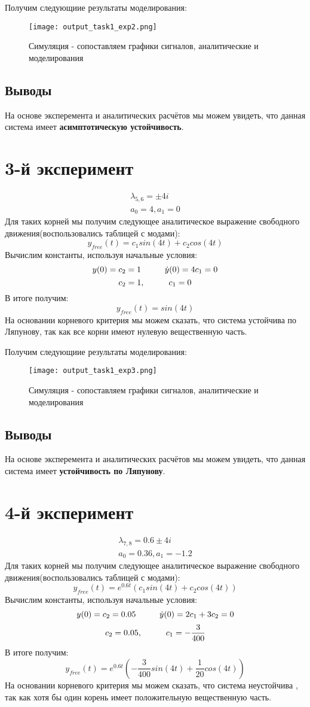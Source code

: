 Получим следующиие результаты моделирования:
\begin{figure}[ht]
    \centering
    \texttt{[image: output\_task1\_exp2.png]}
	\caption{Симуляция - сопоставляем графики сигналов, аналитические и моделирования}
\end{figure}
\subsection{Выводы}
На основе эксперемента и аналитических расчётов мы можем увидеть, что данная система имеет \textbf{асимптотическую устойчивость}.


\newpage
\section{3-й эксперимент}
$$
\begin{aligned}
    \lambda_{5,6} = \pm 4i \\
    a_0 = 4, a_1 = 0
\end{aligned}
$$
Для таких корней мы получим следующее аналитическое выражение свободного движения(воспользовались таблицей с модами):
$$
y_{free}(t) = c_1sin(4t) + c_2cos(4t)
$$
Вычислим константы, используя начальные условия:
$$
    y(0) = c_2 = 1 \hspace*{1cm} \dot{y}(0) = 4c_1 = 0 
$$
$$
    c_2 = 1, \hspace*{1cm} c_1 = 0
$$
В итоге получим:
$$
y_{free}(t) =  sin(4t)
$$
На основании корневого критерия мы можем сказать, что система устойчива по Ляпунову, так как все корни имеют нулевую вещественную часть.

Получим следующиие результаты моделирования:
\begin{figure}[ht]
    \centering
    \texttt{[image: output\_task1\_exp3.png]}
	\caption{Симуляция - сопоставляем графики сигналов, аналитические и моделирования}
\end{figure}
\subsection{Выводы}
На основе эксперемента и аналитических расчётов мы можем увидеть, что данная система имеет \textbf{устойчивость по Ляпунову}.

\newpage
\section{4-й эксперимент}
$$
\begin{aligned}
    \lambda_{7,8} = 0.6 \pm 4i \\
    a_0 = 0.36, a_1 = -1.2
\end{aligned}
$$
Для таких корней мы получим следующее аналитическое выражение свободного движения(воспользовались таблицей с модами):
$$
y_{free}(t) = e^{0.6t}(c_1sin(4t) + c_2cos(4t))
$$
Вычислим константы, используя начальные условия:
$$
    y(0) = c_2 = 0.05 \hspace*{1cm} \dot{y}(0) = 2c_1 + 3c_2 = 0 
$$
$$
    c_2 = 0.05, \hspace*{1cm} c_1 = -\frac{3}{400}
$$
В итоге получим:
$$
y_{free}(t) =  e^{0.6t}(-\frac{3}{400}sin(4t) + \frac{1}{20}cos(4t))
$$
На основании корневого критерия мы можем сказать, что система неустойчива , так как хотя бы один корень имеет положительную вещественную часть.

